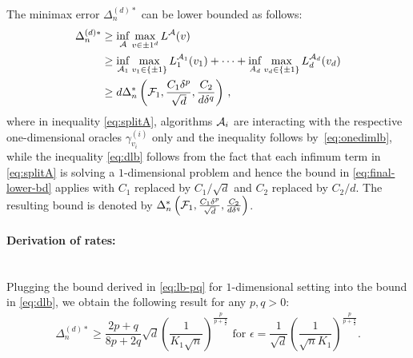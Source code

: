 The minimax error $\Delta_n^{(d)*}$ can be lower bounded as follows:
\begin{align}
\Delta_n^{(d)*}  &\ge  \inf_{\mathcal{A}} \max_{v\in {\pm 1}^d} L^{\mathcal{A}}(v) \nonumber\\
 & \ge \inf_{\mathcal{A}_1} \max_{v_1\in \{\pm 1\}} L_1^{\mathcal{A}_1}(v_1) + \dots + 
 			\inf_{A_d} \max_{v_d\in \{\pm 1 \}} L_d^{\mathcal{A}_d}(v_d) \label{eq:splitA}\\
               & \ge d \Delta_n^{*}\left(\mathcal{F}_1,\frac{C_1\delta^p}{\sqrt d}, \frac{C_2}{d\delta^q}\right)\,, \label{eq:dlb}
\end{align}
where in inequality \eqref{eq:splitA}, algorithms $\mathcal{A}_i$ are interacting with the respective one-dimensional oracles $\gamma^{(i)}_{v_i}$ only 
and the inequality follows by~\eqref{eq:onedimlb},
while the inequality \eqref{eq:dlb} follows from the fact that each infimum term in \eqref{eq:splitA} is solving a $1$-dimensional problem and hence the bound in \eqref{eq:final-lower-bd} applies with $C_1$ replaced by $C_1/\sqrt{d}$ and $C_2$ replaced by $C_2/d$. The resulting bound is denoted by $\Delta_n^{*}\left(\mathcal{F}_1,\frac{C_1\delta^p}{\sqrt d}, \frac{C_2}{d\delta^q}\right)$. 
\fi

\paragraph{Derivation of rates:}\ \\
Plugging the bound derived in \eqref{eq:lb-pq} for $1$-dimensional setting into the bound in \eqref{eq:dlb}, we obtain the following result for any $p, q >0$:
\begin{align}
\Delta_n^{(d)*} \ge  \dfrac{2p+q}{8p+2q}\sqrt{d}\left(\dfrac{1}{ K_1 \sqrt n}\right)^{\frac{p}{p+\frac{q}{2}}} \text{ for } 
\epsilon = \dfrac{1}{\sqrt{d}}\left(\dfrac{1}{\sqrt{n} K_1} \right)^{\frac{p}{p+\frac{q}{2}}}.
\label{eq:lb-pq-d}
\end{align}

